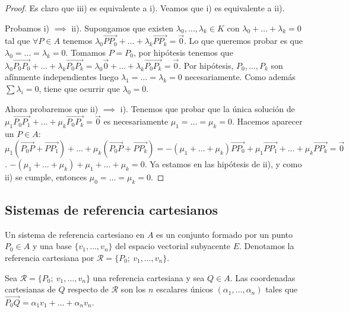 \documentclass[14pt]{book}
\begin{document}
\begin{proof}
	Es claro que iii) es equivalente a i). Veamos que i) es equivalente a ii).
	
	Probamos i) $\implies$ ii). Supongamos que existen $\lambda_0, \dots, \lambda_k \in K$ con $\lambda_0 + \dots + \lambda_k = 0$ tal que $\forall P \in A$ tenemos $\lambda_0\overrightarrow{PP_0} + \dots + \lambda_k\overrightarrow{PP_k} = \overrightarrow{0}$. Lo que queremos probar es que $\lambda_0 = \dots = \lambda_k = 0$. Tomamos $P = P_0$, por hipótesis tenemos que $\lambda_0\overrightarrow{P_0P_0} + \dots + \lambda_k\overrightarrow{P_0P_k} = \lambda_0\overrightarrow{0} + \dots + \lambda_k\overrightarrow{P_0P_k} = \overrightarrow{0}$. Por hipótesis, $P_0, \dots, P_k$ son afínmente independientes luego $\lambda_1 = \dots = \lambda_k = 0$ necesariamente. Como además $\sum \lambda_i = 0$, tiene que ocurrir que $\lambda_0 = 0$.
	
	Ahora probaremos que ii) $\implies$ i). Tenemos que probar que la única solución de $\mu_1 \overrightarrow{P_0 P_1} + \dots  + \mu_k \overrightarrow{P_0 P_k} = \overrightarrow{0}$ es necesariamente $\mu_1 = \dots = \mu_k = 0$. Hacemos aparecer un $P \in A$: $\mu_1 (\overrightarrow{P_0 P} + \overrightarrow{P P_1}) + \dots  + \mu_k (\overrightarrow{P_0 P} + \overrightarrow{P P_k}) = -(\mu_1 + \dots + \mu_k)\overrightarrow{P P_0} + \mu_1 \overrightarrow{P P_1} + \dots  + \mu_k \overrightarrow{P P_k} = \overrightarrow{0}$. $ -(\mu_1 + \dots + \mu_k) + \mu_1 + \dots + \mu_k = 0$. Ya estamos en las hipótesis de ii), y como ii) se cumple, entonces $\mu_0 = \dots = \mu_k = 0$.
\end{proof}

\subsection{Sistemas de referencia cartesianos}
\begin{dfn}
	Un sistema de referencia cartesiano en $A$ es un conjunto formado por un punto $P_0 \in A$ y una base $\{v_1, \dots, v_n\}$ del espacio vectorial subyacente $E$. Denotamos la referencia cartesiana por $\mathcal{R} = \{P_0;\ v_1, \dots, v_n\}$.
\end{dfn}

Sea $\mathcal{R} = \{P_0;\ v_1, \dots, v_n\}$ una referencia cartesiana y sea $Q \in A$. Las coordenadas cartesianas de $Q$ respecto de $\mathcal{R}$ son los $n$ escalares únicos $(\alpha_1, \dots, \alpha_n)$ tales que $\overrightarrow{P_0 Q} = \alpha_1 v_1 + \dots  + \alpha_n v_n$.
\end{document}
